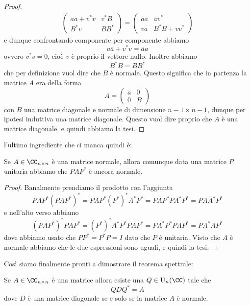 \documentclass[11pt]{scrartcl}
\begin{document}
\begin{proof}
\begin{gather*}
   	 		\left(
   	 		\begin{array}{c|c}
   	 			a\overline{a}+v^*v & v^*B \\
   	 			\hline
   	 			B^*v & BB^*
   	 		\end{array}
   	 		\right)=
   	 		\left(
   	 		\begin{array}{c|c}
   	 			\overline{a}a & \overline{a}v^* \\
   	 			\hline
   	 			va & B^*B+vv^*
   	 		\end{array}
   	 		\right)
   	 	\end{gather*}
   	 	e dunque confrontando componente per componente abbiamo
   	 	$$a\overline{a}+v^*v=\overline{a}a$$
   	 	ovvero $v^*v=0$, cioè $v$ è proprio il vettore nullo. Inoltre abbiamo
   	 	$$B^*B=BB^*$$
   	 	che per definizione vuol dire che $B$ è normale. Questo significa che in partenza la matrice $A$ era della forma
   	 	$$A=
   	 	\left(
   	 	\begin{array}{c|c}
   	 		a & 0 \\
   	 		\hline
   	 		0 & B
   	 	\end{array}
   	 	\right)
   	 	$$
   	 	con $B$ una matrice diagonale e normale di dimensione $n-1\times n-1$, dunque per ipotesi induttiva una matrice diagonale. Questo vuol dire proprio che $A$ è una matrice diagonale, e quindi abbiamo la tesi.
   	 \end{proof}
   	 l'ultimo ingrediente che ci manca quindi è:
   	 \begin{lemma}
   	 	Se $A\in \CC_{n\times n}$ è una matrice normale, allora comunque data una matrice $P$ unitaria abbiamo che $PAP^*$ è ancora normale.
   	 \end{lemma}
   	 \begin{proof}
   	 	Banalmente prendiamo il prodotto con l'aggiunta
   	 	$$PAP^*\left(PAP^*\right)^*=PAP^*\left(P^*\right)^*A^*P^*=PAP^*PA^*P^*=PAA^*P^*$$
   	 	e nell'alto verso abbiamo
   	 	$$\left(PAP^*\right)^*PAP^*=\left(P^*\right)^*A^*P^*PAP^*=PA^*P^*PAP^*=PA^*AP^*$$
   	 	dove abbiamo usato che $PP^*=P^*P=I$ dato che $P$ è unitaria. Visto che $A$ è normale abbiamo che le due espressioni sono uguali, e quindi la tesi.
   	 \end{proof}
   	 Così siamo finalmente pronti a dimostrare il teorema spettrale:
   	 \begin{theorem}
   	 	Se $A\in \CC_{n\times n}$ è una matrice allora esiste una $Q\in \text{U}_n(\CC)$ tale che
   	 	$$QDQ^*=A$$
   	 	dove $D$ è una matrice diagonale se e solo se la matrice $A$ è normale.
   	 \end{theorem}
\end{document}
